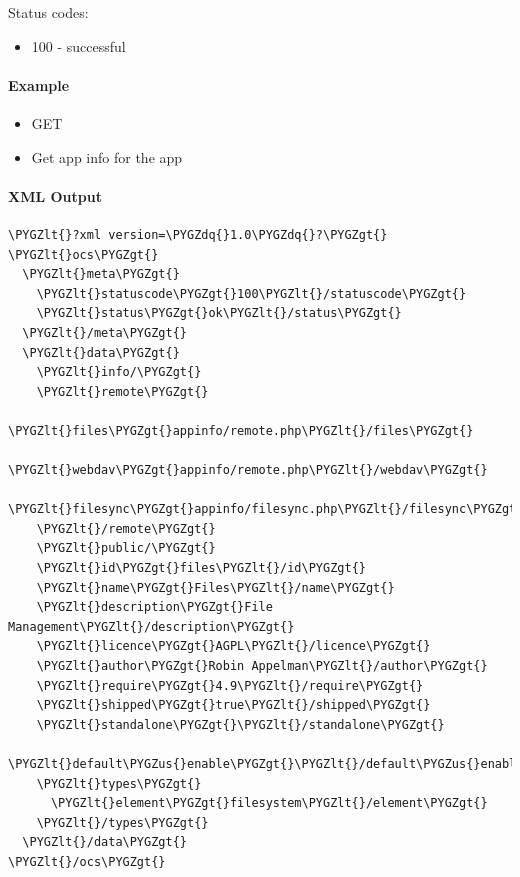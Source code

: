 \documentclass[letterpaper,10pt,english]{sphinxmanual}
\def\PYGZus{\char`\_}
\def\PYGZlt{\char`\<}
\def\PYGZgt{\char`\>}
\def\PYGZdq{\char`\"}
\begin{document}
Status codes:
\begin{itemize}
\item {} 
100 - successful

\end{itemize}


\paragraph{Example}
\label{configuration_user/user_provisioning_api:id32}\begin{itemize}
\item {} 
GET 

\item {} 
Get app info for the  app

\end{itemize}


\paragraph{XML Output}
\label{configuration_user/user_provisioning_api:id33}
\begin{Verbatim}[commandchars=\\\{\}]
\PYGZlt{}?xml version=\PYGZdq{}1.0\PYGZdq{}?\PYGZgt{}
\PYGZlt{}ocs\PYGZgt{}
  \PYGZlt{}meta\PYGZgt{}
    \PYGZlt{}statuscode\PYGZgt{}100\PYGZlt{}/statuscode\PYGZgt{}
    \PYGZlt{}status\PYGZgt{}ok\PYGZlt{}/status\PYGZgt{}
  \PYGZlt{}/meta\PYGZgt{}
  \PYGZlt{}data\PYGZgt{}
    \PYGZlt{}info/\PYGZgt{}
    \PYGZlt{}remote\PYGZgt{}
      \PYGZlt{}files\PYGZgt{}appinfo/remote.php\PYGZlt{}/files\PYGZgt{}
      \PYGZlt{}webdav\PYGZgt{}appinfo/remote.php\PYGZlt{}/webdav\PYGZgt{}
      \PYGZlt{}filesync\PYGZgt{}appinfo/filesync.php\PYGZlt{}/filesync\PYGZgt{}
    \PYGZlt{}/remote\PYGZgt{}
    \PYGZlt{}public/\PYGZgt{}
    \PYGZlt{}id\PYGZgt{}files\PYGZlt{}/id\PYGZgt{}
    \PYGZlt{}name\PYGZgt{}Files\PYGZlt{}/name\PYGZgt{}
    \PYGZlt{}description\PYGZgt{}File Management\PYGZlt{}/description\PYGZgt{}
    \PYGZlt{}licence\PYGZgt{}AGPL\PYGZlt{}/licence\PYGZgt{}
    \PYGZlt{}author\PYGZgt{}Robin Appelman\PYGZlt{}/author\PYGZgt{}
    \PYGZlt{}require\PYGZgt{}4.9\PYGZlt{}/require\PYGZgt{}
    \PYGZlt{}shipped\PYGZgt{}true\PYGZlt{}/shipped\PYGZgt{}
    \PYGZlt{}standalone\PYGZgt{}\PYGZlt{}/standalone\PYGZgt{}
    \PYGZlt{}default\PYGZus{}enable\PYGZgt{}\PYGZlt{}/default\PYGZus{}enable\PYGZgt{}
    \PYGZlt{}types\PYGZgt{}
      \PYGZlt{}element\PYGZgt{}filesystem\PYGZlt{}/element\PYGZgt{}
    \PYGZlt{}/types\PYGZgt{}
  \PYGZlt{}/data\PYGZgt{}
\PYGZlt{}/ocs\PYGZgt{}
\end{Verbatim}
\end{document}
